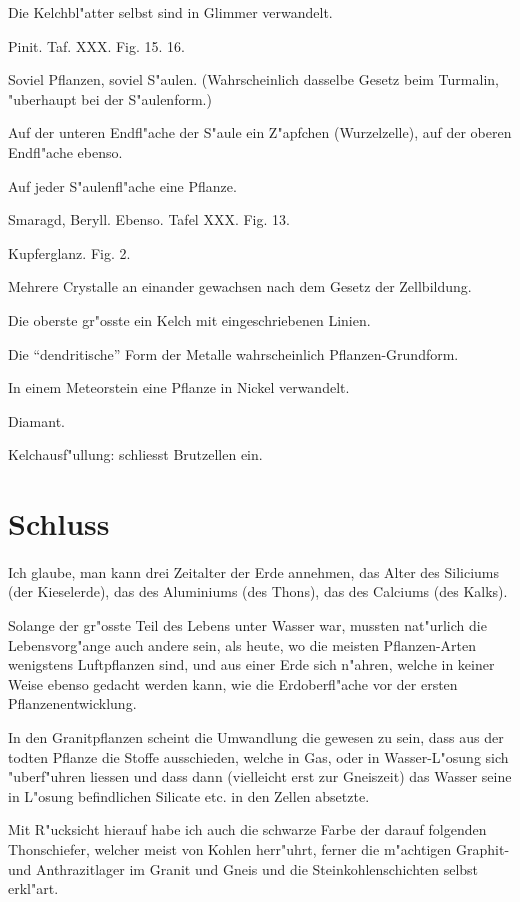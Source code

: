 \documentclass[a4paper, 11pt, oneside, german]{article}
\begin{document}
Die Kelchbl"atter selbst sind in Glimmer verwandelt.

Pinit. Taf. XXX. Fig. 15. 16.

Soviel Pflanzen, soviel S"aulen. (Wahrscheinlich dasselbe Gesetz beim Turmalin, "uberhaupt bei der S"aulenform.)

Auf der unteren Endfl"ache der S"aule ein Z"apfchen (Wurzelzelle), auf der oberen Endfl"ache ebenso.

Auf jeder S"aulenfl"ache eine Pflanze.

Smaragd, Beryll. Ebenso. Tafel XXX. Fig. 13.

Kupferglanz. Fig. 2.

Mehrere Crystalle an einander gewachsen nach dem Gesetz der Zellbildung.

Die oberste gr"osste ein Kelch mit eingeschriebenen Linien.

Die "`dendritische"' Form der Metalle wahrscheinlich Pflanzen-Grundform.

In einem Meteorstein eine Pflanze in Nickel verwandelt.

Diamant.

Kelchausf"ullung: schliesst Brutzellen ein.
\clearpage
\section{Schluss}
\paragraph{}
Ich glaube, man kann drei Zeitalter der Erde annehmen, das Alter des Siliciums (der Kieselerde), das des Aluminiums (des Thons), das des Calciums (des Kalks).

Solange der gr"osste Teil des Lebens unter Wasser war, mussten nat"urlich die Lebensvorg"ange auch andere sein, als heute, wo die meisten Pflanzen-Arten wenigstens Luftpflanzen sind, und aus einer Erde sich n"ahren, welche in keiner Weise ebenso gedacht werden kann, wie die Erdoberfl"ache vor der ersten Pflanzenentwicklung.

In den Granitpflanzen scheint die Umwandlung die gewesen zu sein, dass aus der todten Pflanze die Stoffe ausschieden, welche in Gas, oder in Wasser-L"osung sich "uberf"uhren liessen und dass dann (vielleicht erst zur Gneiszeit) das Wasser seine in L"osung befindlichen Silicate etc. in den Zellen absetzte.

Mit R"ucksicht hierauf habe ich auch die schwarze Farbe der darauf folgenden Thonschiefer, welcher meist von Kohlen herr"uhrt, ferner die m"achtigen Graphit- und Anthrazitlager im Granit und Gneis und die Steinkohlenschichten selbst erkl"art.
\end{document}
